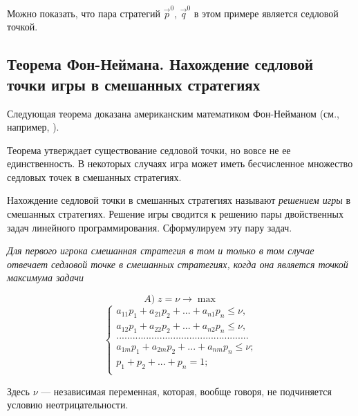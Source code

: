 Можно показать, что пара стратегий $\vec{p}^0$, $\vec{q}^0$ в этом примере является седловой точкой.

\subsection{Теорема Фон-Неймана. Нахождение седловой точки игры
 в смешанных стратегиях}

Следующая теорема доказана американским математиком Фон-Нейманом (см., например, \cite{literature_neiman}).


Теорема утверждает существование седловой точки, но вовсе не ее единственность. В некоторых случаях игра может иметь бесчисленное множество седловых точек в смешанных стратегиях.

Нахождение седловой точки в смешанных стратегиях называют \emph{решением игры} в смешанных стратегиях. Решение игры сводится к решению пары двойственных задач линейного программирования. Сформулируем эту пару задач.

\emph{Для первого игрока смешанная стратегия в том и только в том случае отвечает седловой точке в смешанных стратегиях, когда она является точкой максимума задачи}

\begin{equation}
\label{equation_4_8}
A) \; z = \nu \to \max
\end{equation}
\begin{equation}
\label{equation_4_9}
\begin{cases}
a_{11}p_{1} + a_{21}p_{2} + ... + a_{n1}p_{n} \leqslant \nu,\\
a_{12}p_{1} + a_{22}p_{2} + ... + a_{n2}p_{n} \leqslant \nu, \\
................................................. \\
a_{1m}p_{1} + a_{2m}p_{2} + ... + a_{nm}p_{n} \leqslant \nu; \\
p_{1} + p_{2} + ... + p_{n} = 1; \\
\end{cases}
\end{equation}



Здесь $\nu$ — независимая переменная, которая, вообще говоря, не подчиняется условию неотрицательности.


